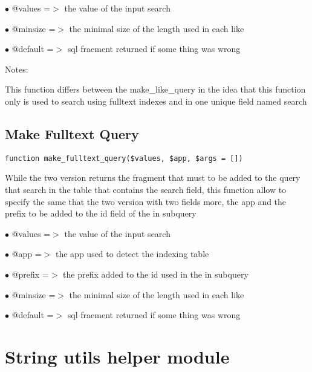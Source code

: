 \documentclass[a4paper]{book}
\begin{document}
\begin{compactitem}
\item[\color{myblue}$\bullet$] @values  =$>$ the value of the input search
\item[\color{myblue}$\bullet$] @minsize =$>$ the minimal size of the length used in each like
\item[\color{myblue}$\bullet$] @default =$>$ sql fraement returned if some thing was wrong
\end{compactitem}

Notes:

This function differs between the make\_like\_query in the idea that this
function only is used to search using fulltext indexes and in one unique
field named search

\hypertarget{toc268}{}
\subsection{Make Fulltext Query}

\begin{lstlisting}
function make_fulltext_query($values, $app, $args = [])
\end{lstlisting}

While the two version returns the fragment that must to be added to the
query that search in the table that contains the search field, this function
allow to specify the same that the two version with two fields more, the
app and the prefix to be added to the id field of the in subquery

\begin{compactitem}
\item[\color{myblue}$\bullet$] @values  =$>$ the value of the input search
\item[\color{myblue}$\bullet$] @app     =$>$ the app used to detect the indexing table
\item[\color{myblue}$\bullet$] @prefix  =$>$ the prefix added to the id used in the in subquery
\item[\color{myblue}$\bullet$] @minsize =$>$ the minimal size of the length used in each like
\item[\color{myblue}$\bullet$] @default =$>$ sql fraement returned if some thing was wrong
\end{compactitem}

\hypertarget{toc269}{}
\section{String utils helper module}
\end{document}
